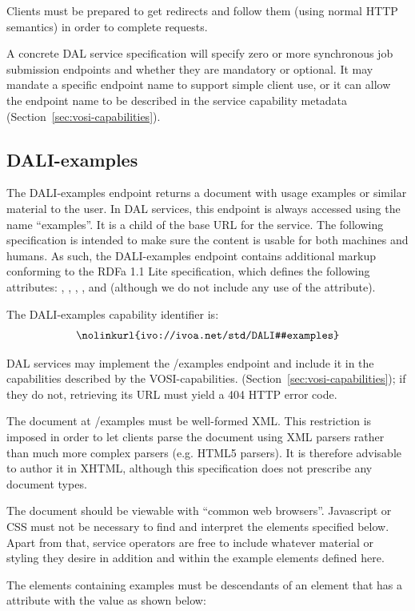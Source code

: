 \documentclass[11pt,letter]{ivoa}
\begin{document}
Clients must be prepared to get redirects and follow them (using normal HTTP
semantics) in order to complete requests.

A concrete DAL service specification will specify zero or more synchronous job
submission endpoints and whether they are mandatory or optional. It may mandate
a specific endpoint name to support simple client use, or it can allow the
endpoint name to be described in the service capability metadata
(Section~\ref{sec:vosi-capabilities}).

\subsection{DALI-examples}
\label{sec:dali-examples}
The DALI-examples endpoint returns a document with usage examples or similar
material to the user. In DAL services, this endpoint is always accessed
using the name ``examples''. It is a child of the base URL for the service. The
following specification is intended to make sure the content is usable for both
machines and humans. As such, the DALI-examples endpoint contains additional
markup conforming to the RDFa 1.1 Lite \citep{std:RDFaLite11} specification,
which defines the
following attributes: , , ,
, and  (although we
do not include any use of the  attribute).

The DALI-examples capability identifier is:
$$
\hbox{\nolinkurl{ivo://ivoa.net/std/DALI#examples}}
$$

DAL services may implement the /examples endpoint and include it in the
capabilities described by the VOSI-capabilities.
(Section~\ref{sec:vosi-capabilities}); if they
do not, retrieving its URL must yield a 404 HTTP error code.

The document at /examples must be well-formed XML. This restriction is imposed
in order to let clients parse the document using XML parsers rather than
much more complex parsers (e.g. HTML5 parsers). It is therefore advisable to
author it in XHTML, although this specification does not prescribe any document
types.

The document should be viewable with ``common web browsers''. Javascript or CSS
must not be necessary to find and interpret the elements specified below.  Apart
from that, service operators are free to include whatever material or styling
they desire in addition and within the example elements defined here.

The elements containing examples must be descendants of an element that has a
 attribute with the value as shown below:
\end{document}
